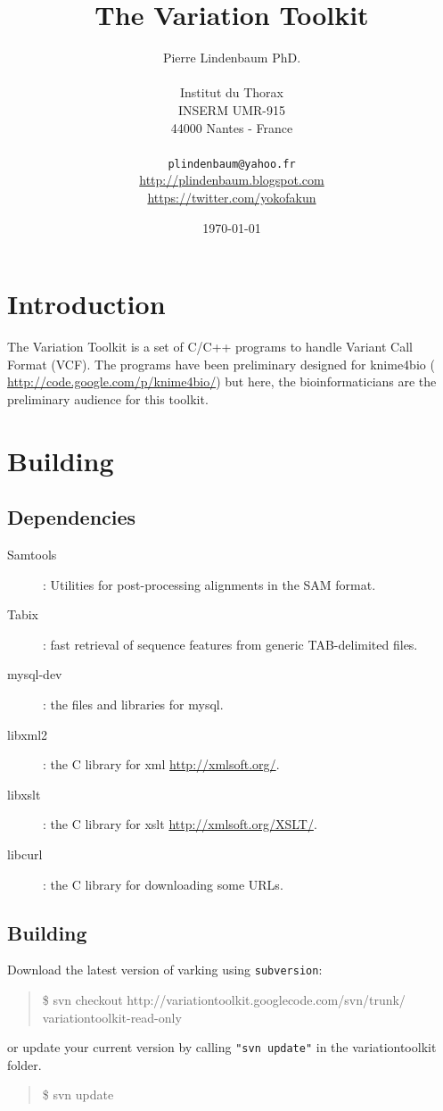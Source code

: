 \documentclass[12pt]{article}
\title{The Variation Toolkit}
\author{Pierre Lindenbaum PhD.
\\
\\Institut du Thorax\\INSERM UMR-915\\44000 Nantes - France\\
\\
\texttt{plindenbaum@yahoo.fr}\\ \url{http://plindenbaum.blogspot.com}\\ \url{https://twitter.com/yokofakun}
\\
}
\date{\today}
\begin{document}
\maketitle

\cleardoublepage
\section{Introduction}
The Variation Toolkit is a set of C/C++ programs to handle Variant Call Format (VCF).
The programs have been preliminary designed for knime4bio ( \url{http://code.google.com/p/knime4bio/}) \cite{pmid21984761}
but here, the bioinformaticians are the preliminary audience for this toolkit.
\section{Building}
\subsection{Dependencies}
\begin{description}
\item[Samtools]: Utilities for post-processing alignments in the SAM format. \cite{pmid19505943}
\item[Tabix]: fast retrieval of sequence features from generic TAB-delimited files. \cite{pmid21208982}
\item[mysql-dev]: the files and libraries for mysql.
\item[libxml2]: the C library for xml \url{http://xmlsoft.org/}.
\item[libxslt]: the C library for xslt \url{http://xmlsoft.org/XSLT/}.
\item[libcurl]: the C library for downloading some URLs.
\end{description}
\subsection{Building}
Download the latest version of varking using \texttt{subversion}:

\begin{quote}
\$ svn checkout http://variationtoolkit.googlecode.com/svn/trunk/ variationtoolkit-read-only
\end{quote}

or update your current version by calling \texttt{"svn update"} in the  variationtoolkit folder.
\begin{quote} 
\$ svn update
\end{quote}
\end{document}
